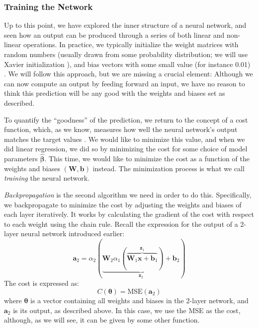 \subsubsection{Training the Network}
Up to this point, we have explored the inner structure of a neural network, and seen how an output can be produced through a series of both linear and non-linear operations. In practice, we typically initialize the weight matrices with random numbers (usually drawn from some probability distribution; we will use Xavier initialization \cite{Xavier}), and bias vectors with some small value (for instance 0.01) \cite{MHJweek42}. We will follow this approach, but we are missing a crucial element: Although we can now compute an output by feeding forward an input, we have no reason to think this prediction will be any good with the weights and biases set as described. 

To quantify the ``goodness'' of the prediction, we return to the concept of a cost function, which, as we know, measures how well the neural network's output matches the target values \cite{fysstkproject1}. We would like to minimize this value, and when we did linear regression, we did so by minimizing the cost for some choice of model parameters $\boldsymbol{\hat{\beta}}$. This time, we would like to minimize the cost as a function of the weights and biases $(\mathbf{W}, \boldsymbol b)$ instead. The minimization process is what we call \emph{training} the neural network. 

\emph{Backpropagation} is the second algorithm we need in order to do this. Specifically, we backpropagate to minimize the cost by adjusting the weights and biases of each layer iteratively. It works by calculating the gradient of the cost with respect to each weight using the chain rule. Recall the expression for the output of a 2-layer neural network introduced earlier:
\[\boldsymbol{a}_2 = \alpha_2(\underbrace{\mathbf W_2 \alpha_1(\overbrace{\mathbf W_1 \boldsymbol{x} + \boldsymbol b_1}^{\boldsymbol z_1})  + \boldsymbol b_2}_{\boldsymbol z_2})\]
The cost is expressed as:
\[C(\boldsymbol{\theta}) = \text{MSE}(\boldsymbol a_2)\]
where $\boldsymbol{\theta}$ is a vector containing all weights and biases in the 2-layer network, and $\boldsymbol a_2$ is its output, as described above. In this case, we use the MSE as the cost, although, as we will see, it can be given by some other function. 

